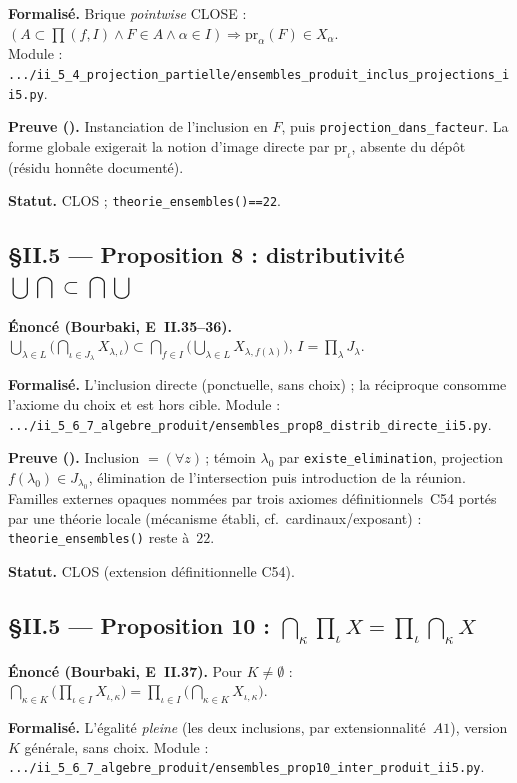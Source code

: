 \textbf{Formalisé.} Brique \emph{pointwise} CLOSE :
$(A\subset\prod(f,I) \wedge F\in A \wedge \alpha\in I) \Rightarrow \mathrm{pr}_\alpha(F)\in X_\alpha$. \\
Module : \texttt{.../ii\_5\_4\_projection\_partielle/ensembles\_produit\_inclus\_projections\_ii5.py}.

\textbf{Preuve (\Nstar).} Instanciation de l'inclusion en $F$, puis
\texttt{projection\_dans\_facteur}. La forme globale exigerait la notion d'image
directe par $\mathrm{pr}_\iota$, absente du dépôt (résidu honnête documenté).

\textbf{Statut.} CLOS ; \texttt{theorie\_ensembles()==22}.

\subsection{§II.5 --- Proposition 8 : distributivité $\bigcup\bigcap\subset\bigcap\bigcup$}
\textbf{Énoncé (Bourbaki, E~II.35--36).}
$\bigcup_{\lambda\in L}\bigl(\bigcap_{\iota\in J_\lambda}X_{\lambda,\iota}\bigr)
\subset \bigcap_{f\in I}\bigl(\bigcup_{\lambda\in L}X_{\lambda,f(\lambda)}\bigr)$, $I=\prod_\lambda J_\lambda$.

\textbf{Formalisé.} L'inclusion directe (ponctuelle, sans choix) ; la réciproque
consomme l'axiome du choix et est hors cible. Module :
\texttt{.../ii\_5\_6\_7\_algebre\_produit/ensembles\_prop8\_distrib\_directe\_ii5.py}.

\textbf{Preuve (\Nstar).} Inclusion $=(\forall z)$\,; témoin $\lambda_0$ par
\texttt{existe\_elimination}, projection $f(\lambda_0)\in J_{\lambda_0}$, élimination de
l'intersection puis introduction de la réunion. Familles externes opaques nommées par
trois axiomes définitionnels~C54 portés par une théorie locale (mécanisme établi,
cf.\ cardinaux/exposant) : \texttt{theorie\_ensembles()} reste à~$22$.

\textbf{Statut.} CLOS (extension définitionnelle C54).

\subsection{§II.5 --- Proposition 10 : $\bigcap_\kappa\prod_\iota X = \prod_\iota\bigcap_\kappa X$}
\textbf{Énoncé (Bourbaki, E~II.37).} Pour $K\neq\emptyset$ :
$\bigcap_{\kappa\in K}\bigl(\prod_{\iota\in I}X_{\iota,\kappa}\bigr)
= \prod_{\iota\in I}\bigl(\bigcap_{\kappa\in K}X_{\iota,\kappa}\bigr)$.

\textbf{Formalisé.} L'égalité \emph{pleine} (les deux inclusions, par extensionnalité~$A1$),
version $K$ générale, sans choix. Module :
\texttt{.../ii\_5\_6\_7\_algebre\_produit/ensembles\_prop10\_inter\_produit\_ii5.py}.

